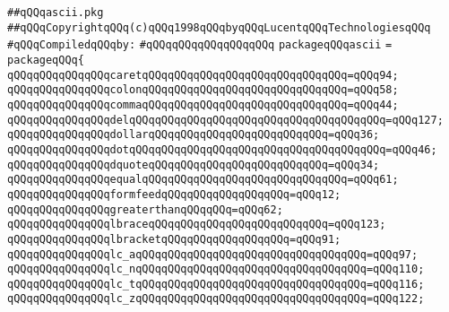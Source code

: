 \label{src/lib/c-kit/src/parser/stuff/ascii.pkg}
\verb|##qQQqascii.pkg|\newline
\verb|##qQQqCopyrightqQQq(c)qQQq1998qQQqbyqQQqLucentqQQqTechnologiesqQQq|\newline
\newline
\verb|#qQQqCompiledqQQqby:|\newline
\verb|#qQQqqQQqqQQqqQQqqQQq|\newline
\newline
\verb|packageqQQqascii|\newline
\verb|=|\newline
\verb|packageqQQq{|\newline
\verb|qQQqqQQqqQQqqQQqcaretqQQqqQQqqQQqqQQqqQQqqQQqqQQqqQQq=qQQq94;|\newline
\verb|qQQqqQQqqQQqqQQqcolonqQQqqQQqqQQqqQQqqQQqqQQqqQQqqQQq=qQQq58;|\newline
\verb|qQQqqQQqqQQqqQQqcommaqQQqqQQqqQQqqQQqqQQqqQQqqQQqqQQq=qQQq44;|\newline
\verb|qQQqqQQqqQQqqQQqdelqQQqqQQqqQQqqQQqqQQqqQQqqQQqqQQqqQQqqQQq=qQQq127;|\newline
\verb|qQQqqQQqqQQqqQQqdollarqQQqqQQqqQQqqQQqqQQqqQQqqQQq=qQQq36;|\newline
\verb|qQQqqQQqqQQqqQQqdotqQQqqQQqqQQqqQQqqQQqqQQqqQQqqQQqqQQqqQQq=qQQq46;|\newline
\verb|qQQqqQQqqQQqqQQqdquoteqQQqqQQqqQQqqQQqqQQqqQQqqQQq=qQQq34;|\newline
\verb|qQQqqQQqqQQqqQQqequalqQQqqQQqqQQqqQQqqQQqqQQqqQQqqQQq=qQQq61;|\newline
\verb|qQQqqQQqqQQqqQQqformfeedqQQqqQQqqQQqqQQqqQQq=qQQq12;|\newline
\verb|qQQqqQQqqQQqqQQqgreaterthanqQQqqQQq=qQQq62;|\newline
\verb|qQQqqQQqqQQqqQQqlbraceqQQqqQQqqQQqqQQqqQQqqQQqqQQq=qQQq123;|\newline
\verb|qQQqqQQqqQQqqQQqlbracketqQQqqQQqqQQqqQQqqQQq=qQQq91;|\newline
\verb|qQQqqQQqqQQqqQQqlc_aqQQqqQQqqQQqqQQqqQQqqQQqqQQqqQQqqQQq=qQQq97;|\newline
\verb|qQQqqQQqqQQqqQQqlc_nqQQqqQQqqQQqqQQqqQQqqQQqqQQqqQQqqQQq=qQQq110;|\newline
\verb|qQQqqQQqqQQqqQQqlc_tqQQqqQQqqQQqqQQqqQQqqQQqqQQqqQQqqQQq=qQQq116;|\newline
\verb|qQQqqQQqqQQqqQQqlc_zqQQqqQQqqQQqqQQqqQQqqQQqqQQqqQQqqQQq=qQQq122;|\newline
